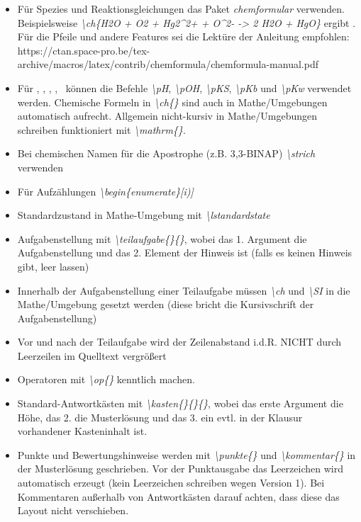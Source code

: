\documentclass[./main.tex]{subfiles}
\begin{document}
\begin{itemize}
    \item F\"ur Spezies und Reaktionsgleichungen das Paket \textit{chemformular} verwenden. Beispielsweise \textit{\textbackslash ch\{H2O + O2 + Hg2\textasciicircum2+ + O\textasciicircum2- -> 2 H2O + HgO\}} ergibt . F\"ur die Pfeile und andere Features sei die Lekt\"ure der Anleitung empfohlen:  https://ctan.space-pro.be/tex-archive/macros/latex/contrib/chemformula/chemformula-manual.pdf
    \item F\"ur \pH, \pOH, \pKs, \pKb, \pKw~k\"onnen die Befehle \textit{\textbackslash pH}, \textit{\textbackslash pOH}, \textit{\textbackslash pKS}, \textit{\textbackslash pKb} und \textit{\textbackslash pKw} verwendet werden. Chemische Formeln in \textit{\textbackslash ch\{\}} sind auch in Mathe\-/Umgebungen automatisch aufrecht. Allgemein nicht-kursiv in Mathe\-/Umgebungen schreiben funktioniert mit \textit{\textbackslash mathrm\{\}}. 
    \item Bei chemischen Namen f\"ur die Apostrophe (z.B. 3,3\strich{}-BINAP) \textit{\textbackslash strich} verwenden
    \item F\"ur Aufz\"ahlungen \textit{\textbackslash begin\{enumerate\}[i)]}
    \item Standardzustand in Mathe-Umgebung mit \textit{\textbackslash lstandardstate}
    \item Aufgabenstellung mit \textit{\textbackslash teilaufgabe\{\}\{\}}, wobei das 1. Argument die Aufgabenstellung und das 2. Element der Hinweis ist (falls es keinen Hinweis gibt, leer lassen)
    \item Innerhalb der Aufgabenstellung einer Teilaufgabe m\"ussen \textit{\textbackslash ch} und \textit{\textbackslash SI} in die Mathe\-/Umgebung gesetzt werden (diese bricht die Kursivschrift der Aufgabenstellung)
    \item Vor und nach der Teilaufgabe wird der Zeilenabstand i.d.R. NICHT durch Leerzeilen im Quelltext vergr\"o\ss{}ert
    \item Operatoren mit \textit{\textbackslash op\{\}} kenntlich machen. 
    \item Standard-Antwortk\"asten mit \textit{\textbackslash kasten\{\}\{\}\{\}}, wobei das erste Argument die H\"ohe, das 2. die Musterl\"osung und das 3. ein evtl. in der Klausur vorhandener Kasteninhalt ist. 
    \item Punkte und Bewertungshinweise werden mit \textit{\textbackslash punkte\{\}} und \textit{\textbackslash kommentar\{\}} in der Musterl\"osung geschrieben. Vor der Punktausgabe das Leerzeichen wird automatisch erzeugt (kein Leerzeichen schreiben wegen Version 1). Bei Kommentaren au\ss{}erhalb von Antwortk\"asten darauf achten, dass diese das Layout nicht verschieben.

\end{itemize}
\end{document}
